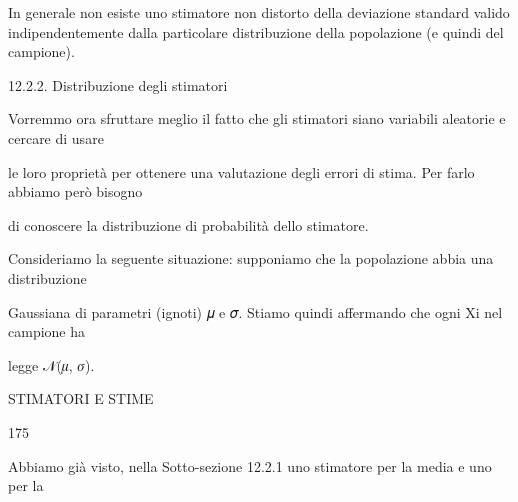 \documentclass[a4paper,portrait,12pt]{article}
\begin{document}
\begin{flushleft}
In generale non esiste uno stimatore non distorto della deviazione standard valido indipendentemente dalla particolare distribuzione della popolazione (e quindi del campione).
\end{flushleft}





\begin{flushleft}
12.2.2. Distribuzione degli stimatori
\end{flushleft}


\begin{flushleft}
Vorremmo ora sfruttare meglio il fatto che gli stimatori siano variabili aleatorie e cercare di usare
\end{flushleft}


\begin{flushleft}
le loro propriet\`{a} per ottenere una valutazione degli errori di stima. Per farlo abbiamo per\`{o} bisogno
\end{flushleft}


\begin{flushleft}
di conoscere la distribuzione di probabilit\`{a} dello stimatore.
\end{flushleft}


\begin{flushleft}
Consideriamo la seguente situazione: supponiamo che la popolazione abbia una distribuzione
\end{flushleft}


\begin{flushleft}
Gaussiana di parametri (ignoti) 𝜇 e 𝜎. Stiamo quindi affermando che ogni Xi nel campione ha
\end{flushleft}


\begin{flushleft}
legge 𝒩(𝜇, 𝜎).
\end{flushleft}





\begin{flushleft}
 STIMATORI E STIME
\end{flushleft}





175





\begin{flushleft}
Abbiamo gi\`{a} visto, nella Sotto-sezione 12.2.1 uno stimatore per la media e uno per la
\end{flushleft}
\end{document}

